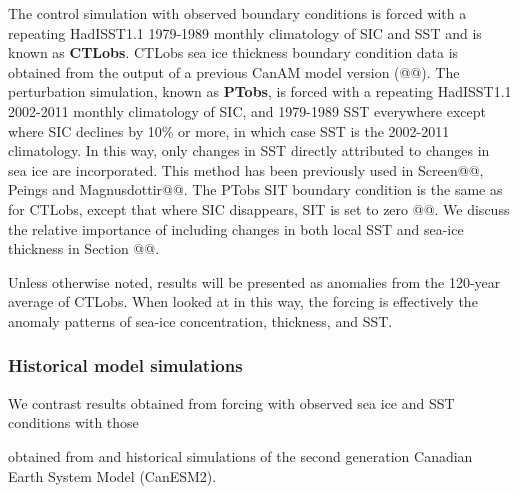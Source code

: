 \documentclass[twocol]{ametsoc}
\begin{document}
The control simulation with observed boundary conditions is forced with a repeating HadISST1.1 1979-1989 monthly climatology of SIC and SST and is known as \textbf{CTLobs}. CTLobs sea ice thickness boundary condition data is obtained from the output of a previous CanAM model version (@@). The perturbation simulation, known as \textbf{PTobs}, is forced with a repeating HadISST1.1 2002-2011 monthly climatology of SIC, and 1979-1989 SST everywhere except where SIC declines by 10\% or more, in which case SST is the 2002-2011 climatology. In this way, only changes in SST directly attributed to changes in sea ice are incorporated. This method has been previously used in Screen@@, Peings and Magnusdottir@@. The PTobs SIT boundary condition is the same as for CTLobs, except that where SIC disappears, SIT is set to zero @@. We discuss the relative importance of including changes in both local SST and sea-ice thickness in Section @@.

Unless otherwise noted, results will be presented as anomalies from the 120-year average of CTLobs. When looked at in this way, the forcing is effectively the anomaly patterns of sea-ice concentration, thickness, and SST. 
 
\subsubsection{Historical model simulations}

 We contrast results obtained from forcing with observed sea ice and SST conditions with those 

 obtained from  and historical simulations of the second generation Canadian Earth System Model (CanESM2).
\end{document}
